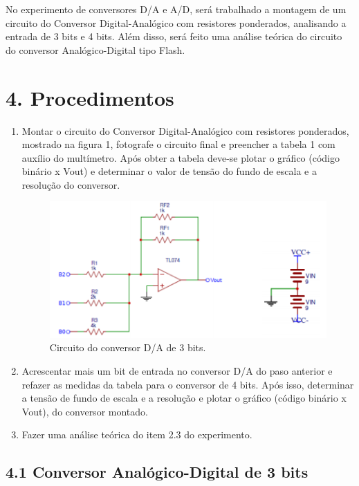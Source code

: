 \documentclass[12pt]{article}
\begin{document}
No experimento de conversores D/A e A/D, será trabalhado a montagem de um circuito do Conversor Digital-Analógico com resistores ponderados, analisando a entrada de 3 bits e 4 bits. Além disso, será feito uma análise teórica do circuito do conversor Analógico-Digital tipo Flash.

\section{4. Procedimentos}
\label{sec:Procedimentos}

\begin{enumerate} 
	\item Montar o circuito do Conversor Digital-Analógico com resistores ponderados, mostrado na figura 1, fotografe o circuito final e preencher a tabela 1 com auxílio do multímetro. Após obter a tabela deve-se plotar o gráfico (código binário x Vout) e determinar o valor de tensão do fundo de escala e a resolução do conversor.

\begin{figure}[H]
\centering
\includegraphics[width=.5\textwidth]{grafico3bitex.png}
\caption{ Circuito do conversor D/A de 3 bits.}
\label{fig:3bitex}
\end{figure}


	\item Acrescentar mais um bit de entrada no conversor D/A do paso anterior e refazer as medidas da tabela para o conversor de 4 bits. Após isso, determinar a tensão de fundo de escala e a resolução e plotar o gráfico (código binário x Vout), do conversor montado. 

	\item Fazer uma análise teórica do item 2.3 do experimento.
 
\end{enumerate}

\subsection{4.1 Conversor Analógico-Digital de 3 bits}
\label{sec:CAD3}
\end{document}
